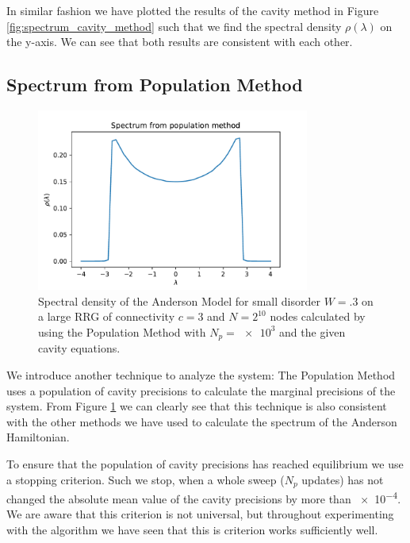 \documentclass[../main.tex]{subfiles}
\begin{document}
In similar fashion we have plotted the results of the cavity method in Figure \ref{fig:spectrum_cavity_method} such that we find the spectral density $\rho(\lambda)$ on the y-axis.
We can see that both results are consistent with each other.


\subsection{Spectrum from Population Method}

\begin{figure}[htpb]
    \centering
    \includegraphics[width=0.8\textwidth]{../figures/ex3_spectrum_population.pdf}
    \caption{Spectral density of the Anderson Model for small disorder $W = \num{.3}$ on a large RRG of connectivity $c=3$ and $ N = 2^{10}$ nodes calculated by using the Population Method with $N_p = \num{e3}$ and the given cavity equations.}
    \label{fig:spectrum_population_method}
\end{figure}

We introduce another technique to analyze the system:
The Population Method uses a population of cavity precisions to calculate the marginal precisions of the system.
From Figure \ref{fig:spectrum_population_method} we can clearly see that this technique is also consistent with the other methods we have used to calculate the spectrum of the Anderson Hamiltonian.
\par

To ensure that the population of cavity precisions has reached equilibrium we use a stopping criterion.
Such we stop, when a whole sweep ($N_p$ updates) has not changed the absolute mean value of the cavity precisions by more than \num{e-4}.
We are aware that this criterion is not universal, but throughout experimenting with the algorithm we have seen that this is criterion works sufficiently well.
\end{document}
